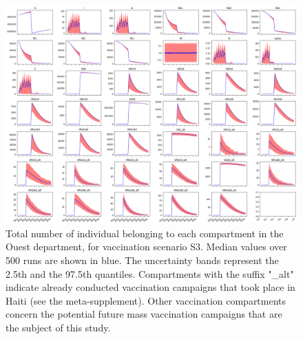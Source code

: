 \begin{figure}[htbp]
\begin{center}
\includegraphics[width=1.0\textwidth]{fig_cholera-haiti-ocv/comps.png}
\caption[Total number of individual belonging to each compartment in the Ouest department]{Total number of individual belonging to each compartment in the Ouest department, for vaccination scenario S3. Median values over 500 runs are shown in blue. The uncertainty bands represent the 2.5th and the 97.5th quantiles. Compartments with the suffix "\_alt" indicate already conducted vaccination campaigns that took place in Haiti (see the meta-supplement). Other vaccination compartments concern the potential future mass vaccination campaigns that are the subject of this study.}
\label{figCompartiment}
\end{center}
\end{figure}


